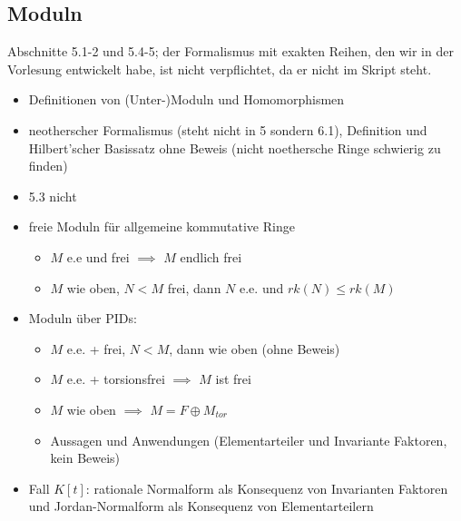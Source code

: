 \documentclass[a4paper, 12pt]{article}
\begin{document}
\subsection{Moduln}
Abschnitte 5.1-2 und 5.4-5; der Formalismus mit exakten Reihen, den wir in der Vorlesung entwickelt habe, ist nicht verpflichtet, da er nicht im Skript steht.
\begin{itemize}
	\item Definitionen von (Unter-)Moduln und Homomorphismen
	\item neotherscher Formalismus (steht nicht in 5 sondern 6.1), Definition und Hilbert'scher Basissatz ohne Beweis (nicht noethersche Ringe schwierig zu finden)
	\item 5.3 nicht
	\item freie Moduln für allgemeine kommutative Ringe
	\begin{itemize}
		\item $M$ e.e und frei $\implies$ $M$ endlich frei
		\item $M$ wie oben, $N<M$ frei, dann $N$ e.e. und $rk(N) \leq rk(M)$
	\end{itemize}
	\item Moduln über PIDs: \begin{itemize}
		\item $M$ e.e. + frei, $N<M$, dann wie oben (ohne Beweis)
		\item $M$ e.e. + torsionsfrei $\implies$ $M$ ist frei
		\item $M$ wie oben $\implies$ $M = F \oplus M_{tor}$
		\item Aussagen und Anwendungen (Elementarteiler und Invariante Faktoren, kein Beweis)
	\end{itemize}
	\item Fall $K[t]$: rationale Normalform als Konsequenz von Invarianten Faktoren und Jordan-Normalform als Konsequenz von Elementarteilern 
\end{itemize}
\end{document}
